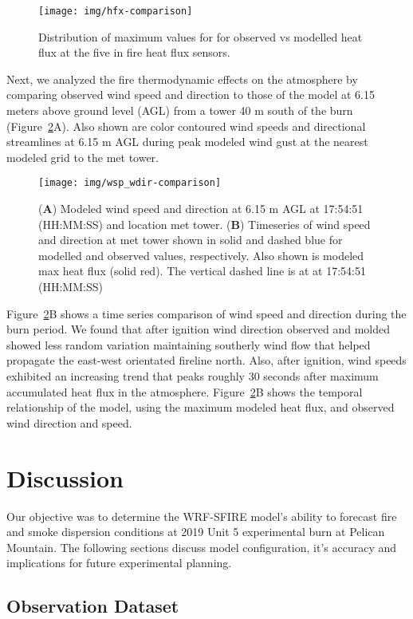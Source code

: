 \documentclass[preprints,article,accept,moreauthors,pdftex]{Definitions/mdpi}
\begin{document}
\begin{figure}[H]
\centering
 \texttt{[image: img/hfx-comparison]}
 \caption{Distribution of maximum values for for observed vs modelled heat flux at the five in fire heat flux sensors.\label{fig6}}
 \end{figure}

Next, we analyzed the fire thermodynamic effects on the atmosphere by comparing observed wind speed and direction to those of the model at 6.15 meters above ground level (AGL) from a tower 40 m south of the burn (Figure~\ref{fig7}A). Also shown are color contoured wind speeds and directional streamlines at 6.15 m AGL during peak modeled wind gust at the nearest modeled grid to the met tower.

\begin{figure}[H]
\centering
 \texttt{[image: img/wsp\_wdir-comparison]}
 \caption{(\textbf{A}) Modeled wind speed and direction at 6.15 m AGL at 17:54:51 (HH:MM:SS) and location met tower. (\textbf{B}) Timeseries of wind speed and direction at met tower shown in solid and dashed blue for modelled and observed values, respectively. Also shown is modeled max heat flux (solid red). The vertical dashed line is at at 17:54:51 (HH:MM:SS)\label{fig7}}
 \end{figure}

Figure~\ref{fig7}B shows a time series comparison of wind speed and direction during the burn period. We found that after ignition wind direction observed and molded showed less random variation maintaining southerly wind flow that helped propagate the east-west orientated fireline north. Also, after ignition, wind speeds exhibited an increasing trend that peaks roughly 30 seconds after maximum accumulated heat flux in the atmosphere. Figure~\ref{fig7}B shows the temporal relationship of the model, using the maximum modeled heat flux, and observed wind direction and speed.

\section{Discussion}

Our objective was to determine the WRF-SFIRE model’s ability to forecast fire and smoke dispersion conditions at 2019 Unit 5 experimental burn at Pelican Mountain. The following sections discuss model configuration, it's accuracy and implications for future experimental planning.

\subsection{Observation Dataset}
\end{document}
